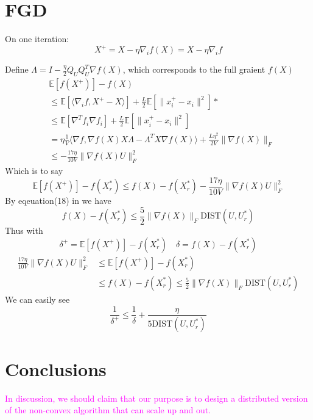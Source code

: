 \documentclass[letterpaper]{article} %
\begin{document}
\section{FGD}
On one iteration:
$$X^+=X-\eta \nabla_i f(X)= X-\eta \nabla_i f$$

Define $\Lambda=I-\frac{\eta}{2}Q_UQ_U^T\nabla f(X)$, which corresponds to the full graient $f(X)$
\begin{equation}
\begin{split}
&\mathbb{E}[f(X^+)]-f(X)\\&\le \mathbb{E}[\langle\nabla_i f, X^+-X \rangle]+\frac{L}{2}\mathbb{E}[\|x_i^+-x_i\|^2] * \\
&\le \mathbb{E}[\nabla^T f_i \nabla f_i]+\frac{L}{2}\mathbb{E}[\|x_i^+-x_i\|^2]\\
&=\eta\frac{1}{V}\langle\nabla f, \nabla f(X)X\Lambda-\Lambda^T X\nabla f(X)\rangle+\frac{L\eta^2}{2V}\|\nabla f(X)\|_F\\
&\le-\frac{17\eta}{10V}\|\nabla f(X)U\|^2_F
\end{split}
\end{equation}
Which is to say
\begin{equation}
 \mathbb{E}[f(X^+)]-f(X_r^*)\le f(X)-f(X_r^*)-\frac{17\eta}{10V}\|\nabla f(X)U\|^2_F
\end{equation}
By eqeuation(18) in \cite{tu2015low} we have 
\begin{equation}
f(X)-f(X_r^*)\le\frac{5}{2}\|\nabla f(X)\|_F\text{DIST}(U,U^*_r)
\end{equation}
Thus with 
$$\delta^+= \mathbb{E}[f(X^+)]-f(X_r^*)\quad \delta=f(X)-f(X_r^*)$$
\begin{equation}
\begin{split}
\frac{17\eta}{10V}\|\nabla f(X)U\|^2_F &\le
\mathbb{E}[f(X^+)]-f(X_r^*)\\&\le f(X)-f(X_r^*)
\le \frac{5}{2}\|\nabla f(X)\|_F\text{DIST}(U,U^*_r)
\end{split}
\end{equation}
We can easily see
\begin{equation}
\frac{1}{\delta^+}\le\frac{1}{\delta}+ \frac{\eta}{5\text{DIST}(U,U^*_r)}
\end{equation}
\section{Conclusions}
\textcolor{magenta}{In discussion, we should claim that our purpose is to design a distributed version of the non-convex algorithm that can scale up and out.}



\end{document}
